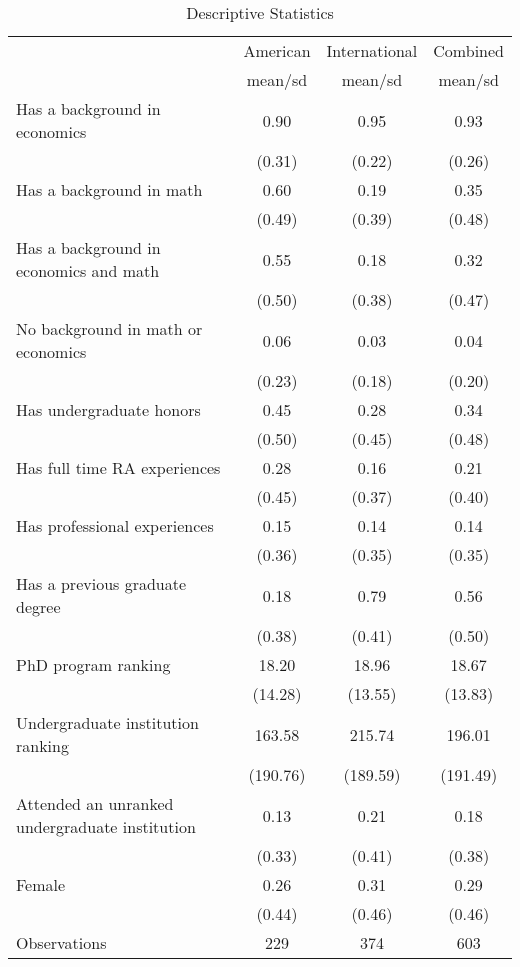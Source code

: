 \begin{table}[htbp]\centering
\def\sym#1{\ifmmode^{#1}\else\(^{#1}\)\fi}
\caption{Descriptive Statistics}
\begin{tabular}{l*{3}{c}}
\hline\hline
                    &\multicolumn{1}{c}{American}&\multicolumn{1}{c}{International}&\multicolumn{1}{c}{Combined}\\
                    &     mean/sd&     mean/sd&     mean/sd\\
\hline
Has a background in economics&        0.90&        0.95&        0.93\\
                    &      (0.31)&      (0.22)&      (0.26)\\
Has a background in math&        0.60&        0.19&        0.35\\
                    &      (0.49)&      (0.39)&      (0.48)\\
Has a background in economics and math&        0.55&        0.18&        0.32\\
                    &      (0.50)&      (0.38)&      (0.47)\\
No background in math or economics&        0.06&        0.03&        0.04\\
                    &      (0.23)&      (0.18)&      (0.20)\\
Has undergraduate honors&        0.45&        0.28&        0.34\\
                    &      (0.50)&      (0.45)&      (0.48)\\
Has full time RA experiences&        0.28&        0.16&        0.21\\
                    &      (0.45)&      (0.37)&      (0.40)\\
Has professional experiences&        0.15&        0.14&        0.14\\
                    &      (0.36)&      (0.35)&      (0.35)\\
Has a previous graduate degree&        0.18&        0.79&        0.56\\
                    &      (0.38)&      (0.41)&      (0.50)\\
PhD program ranking &       18.20&       18.96&       18.67\\
                    &     (14.28)&     (13.55)&     (13.83)\\
Undergraduate institution ranking&      163.58&      215.74&      196.01\\
                    &    (190.76)&    (189.59)&    (191.49)\\
Attended an unranked undergraduate institution&        0.13&        0.21&        0.18\\
                    &      (0.33)&      (0.41)&      (0.38)\\
Female              &        0.26&        0.31&        0.29\\
                    &      (0.44)&      (0.46)&      (0.46)\\
\hline
Observations        &         229&         374&         603\\
\hline\hline
\end{tabular}
\end{table}
